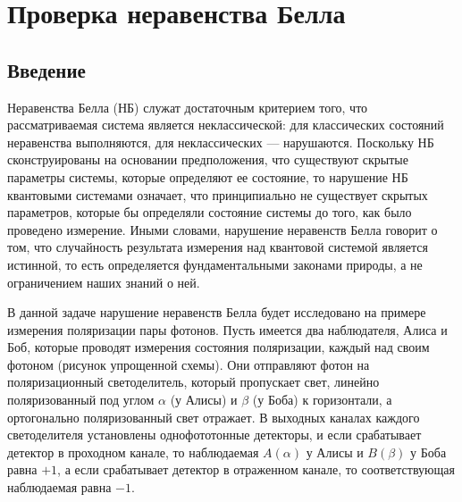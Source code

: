 \documentclass[12pt,a5paper]{article}
\numberwithin{equation}{section}
\begin{document}
\section{Проверка неравенства Белла}
\subsection{Введение}

Неравенства Белла (НБ) служат достаточным критерием того, что рассматриваемая система является неклассической: для классических состояний неравенства выполняются, для неклассических --- нарушаются. Поскольку НБ сконструированы на основании предположения, что существуют скрытые параметры системы, которые определяют ее состояние, то нарушение НБ квантовыми системами означает, что принципиально не существует скрытых параметров, которые бы определяли состояние системы до того, как было проведено измерение. Иными словами, нарушение неравенств Белла говорит о том, что случайность результата измерения над квантовой системой является истинной, то есть определяется фундаментальными законами природы, а не ограничением наших знаний о ней.

В данной задаче нарушение неравенств Белла будет исследовано на примере измерения поляризации пары фотонов.
Пусть имеется два наблюдателя, Алиса и Боб, которые проводят измерения состояния поляризации, каждый над своим фотоном (рисунок упрощенной схемы). Они отправляют фотон на поляризационный светоделитель, который пропускает свет, линейно поляризованный под углом $\alpha$ (у Алисы) и $\beta$ (у Боба) к горизонтали, а ортогонально поляризованный свет отражает. В выходных каналах каждого светоделителя установлены однофототонные детекторы, и если срабатывает детектор в проходном канале, то наблюдаемая $A(\alpha)$ у Алисы и $B(\beta)$ у Боба равна $+1$, а если срабатывает детектор в отраженном канале, то соответствующая наблюдаемая равна $-1$.


\end{document}
